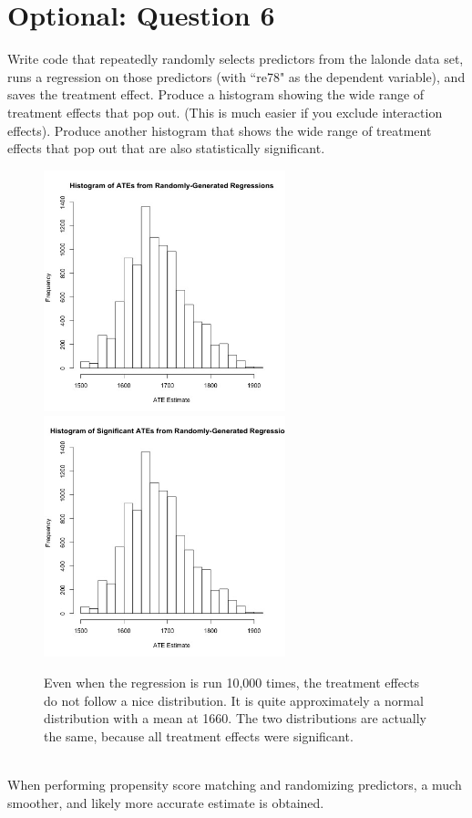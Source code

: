 \documentclass[11pt, oneside]{article}
\begin{document}
\newpage
\section*{Optional: Question 6}
Write code that repeatedly randomly selects predictors from the lalonde data set, runs a regression on those predictors (with ``re78"	 as the dependent variable), and saves the treatment effect.  Produce a histogram showing the wide range of treatment effects that pop out. (This is much easier if you exclude interaction effects). Produce another histogram that shows the wide range of treatment effects that pop out that are also statistically significant.
\begin{figure}[h]
	\includegraphics[width = 7cm, height = 7cm]{atehist.jpg}
	\includegraphics[width = 7cm, height = 7cm]{atehist1.jpg}
	\caption{Even when the regression is run 10,000 times, the treatment effects do not follow a nice distribution. It is quite approximately a normal distribution with a mean at 1660. The two distributions are actually the same, because all treatment effects were significant.}
\end{figure}
\\ When performing propensity score matching and randomizing predictors, a much smoother, and likely more accurate estimate is obtained.
\end{document}
